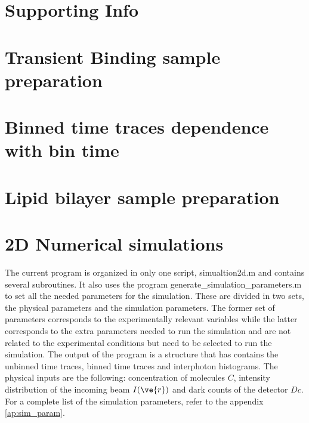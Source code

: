 \section{Supporting Info}
\graphicspath{{./chapters/c3_binfree/si_figure/}}

\section*{Transient Binding sample preparation}


\section*{Binned time traces dependence with bin time}



\section*{Lipid bilayer sample preparation}



\section*{2D Numerical simulations}

The current program is organized in only one script, simualtion2d.m and contains several subroutines. It also uses the program generate\_simulation\_parameters.m to set all the needed parameters for the simulation. These are divided in two sets, the physical parameters and the simulation parameters. 
The former set of parameters corresponds to the experimentally relevant variables while the latter corresponds to the extra parameters needed to run the simulation and are not related to the experimental conditions but need to be selected to run the simulation. 
The output of the program is a structure that has contains the unbinned time traces, binned time traces and interphoton histograms. The physical inputs are the following: concentration of molecules $C$, intensity distribution of the incoming beam $I(\ve{r})$ and dark counts of the detector $Dc$. 
For a complete list of the simulation parameters, refer to the appendix \ref{ap:sim_param}.

